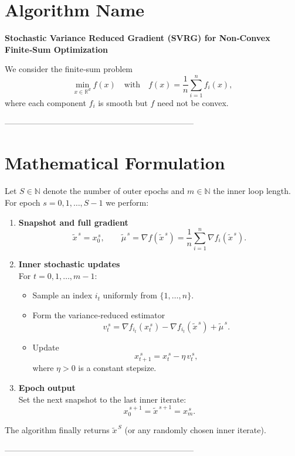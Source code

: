 \documentclass{article}
\newcommand{\R}{\mathbb{R}}
\begin{document}
\section*{Algorithm Name}
\textbf{Stochastic Variance Reduced Gradient (SVRG) for Non‑Convex Finite‑Sum Optimization}  

We consider the finite‑sum problem  
\[
\min_{x\in\R^{d}} f(x)\quad\text{with}\quad 
f(x)=\frac1n\sum_{i=1}^{n} f_i(x),
\]
where each component $f_i$ is smooth but $f$ need not be convex.

---------------------------------------------------------------------

\section*{Mathematical Formulation}
Let $S\in\mathbb N$ denote the number of outer epochs and $m\in\mathbb N$ the inner loop length.  
For epoch $s=0,1,\dots,S-1$ we perform:

\begin{enumerate}
    \item \textbf{Snapshot and full gradient}\\
    \[
    \tilde{x}^{\,s}=x_0^{\,s},\qquad 
    \tilde{\mu}^{\,s}= \nabla f(\tilde{x}^{\,s})=
    \frac1n\sum_{i=1}^{n}\nabla f_i(\tilde{x}^{\,s}).
    \]
    \item \textbf{Inner stochastic updates}\\
    For $t=0,1,\dots,m-1$:
    \begin{itemize}
        \item Sample an index $i_t$ uniformly from $\{1,\dots ,n\}$.
        \item Form the variance‑reduced estimator
        \[
        v_t^{\,s}= \nabla f_{i_t}(x_t^{\,s})-
        \nabla f_{i_t}(\tilde{x}^{\,s})+\tilde{\mu}^{\,s}.
        \]
        \item Update
        \[
        x_{t+1}^{\,s}=x_t^{\,s}-\eta\,v_t^{\,s},
        \]
        where $\eta>0$ is a constant stepsize.
    \end{itemize}
    \item \textbf{Epoch output}\\
    Set the next snapshot to the last inner iterate:
    \[
    x_0^{\,s+1}= \tilde{x}^{\,s+1}=x_m^{\,s}.
    \]
\end{enumerate}
The algorithm finally returns $\tilde{x}^{\,S}$ (or any randomly chosen inner iterate).

---------------------------------------------------------------------
\end{document}
